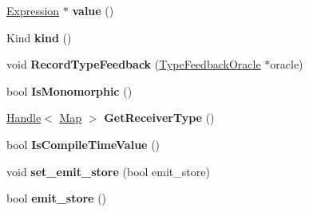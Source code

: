 \begin{DoxyCompactItemize}
\item 
\hypertarget{classv8_1_1internal_1_1_v8___f_i_n_a_l_ac77e6df41bcba8540d35aa41e47f88a2}{}\hyperlink{classv8_1_1internal_1_1_expression}{Expression} $\ast$ {\bfseries value} ()\label{classv8_1_1internal_1_1_v8___f_i_n_a_l_ac77e6df41bcba8540d35aa41e47f88a2}

\item 
\hypertarget{classv8_1_1internal_1_1_v8___f_i_n_a_l_aab9cebb9c2d61dcc9160c68c34f11f19}{}Kind {\bfseries kind} ()\label{classv8_1_1internal_1_1_v8___f_i_n_a_l_aab9cebb9c2d61dcc9160c68c34f11f19}

\item 
\hypertarget{classv8_1_1internal_1_1_v8___f_i_n_a_l_a9f65b1d7803eaf70d3050b53beba0b42}{}void {\bfseries Record\+Type\+Feedback} (\hyperlink{classv8_1_1internal_1_1_type_feedback_oracle}{Type\+Feedback\+Oracle} $\ast$oracle)\label{classv8_1_1internal_1_1_v8___f_i_n_a_l_a9f65b1d7803eaf70d3050b53beba0b42}

\item 
\hypertarget{classv8_1_1internal_1_1_v8___f_i_n_a_l_afd79a8d4afe8e37910b487f7f9fe4fe6}{}bool {\bfseries Is\+Monomorphic} ()\label{classv8_1_1internal_1_1_v8___f_i_n_a_l_afd79a8d4afe8e37910b487f7f9fe4fe6}

\item 
\hypertarget{classv8_1_1internal_1_1_v8___f_i_n_a_l_a4f62574987cefdad592e0185bdaa28fb}{}\hyperlink{classv8_1_1internal_1_1_handle}{Handle}$<$ \hyperlink{classv8_1_1internal_1_1_map}{Map} $>$ {\bfseries Get\+Receiver\+Type} ()\label{classv8_1_1internal_1_1_v8___f_i_n_a_l_a4f62574987cefdad592e0185bdaa28fb}

\item 
\hypertarget{classv8_1_1internal_1_1_v8___f_i_n_a_l_accbc7bb20ca0d9b4164a35a252ad23ac}{}bool {\bfseries Is\+Compile\+Time\+Value} ()\label{classv8_1_1internal_1_1_v8___f_i_n_a_l_accbc7bb20ca0d9b4164a35a252ad23ac}

\item 
\hypertarget{classv8_1_1internal_1_1_v8___f_i_n_a_l_adbeef76f6bf0b37f06d539034463bc5c}{}void {\bfseries set\+\_\+emit\+\_\+store} (bool emit\+\_\+store)\label{classv8_1_1internal_1_1_v8___f_i_n_a_l_adbeef76f6bf0b37f06d539034463bc5c}

\item 
\hypertarget{classv8_1_1internal_1_1_v8___f_i_n_a_l_ad2f9494a12c1eb528577380b52859a3c}{}bool {\bfseries emit\+\_\+store} ()\label{classv8_1_1internal_1_1_v8___f_i_n_a_l_ad2f9494a12c1eb528577380b52859a3c}


\end{DoxyCompactItemize}
